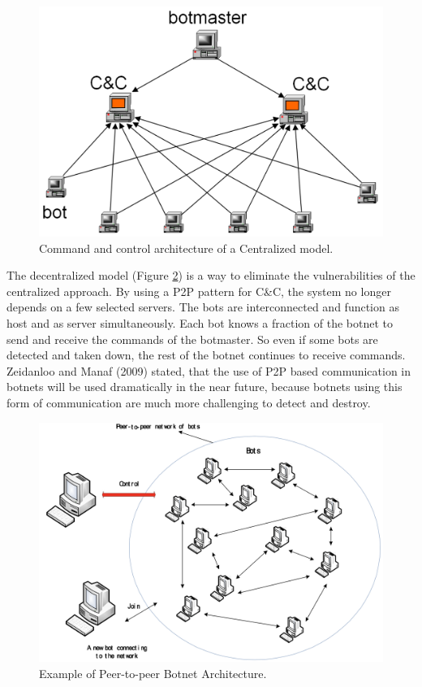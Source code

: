 \begin{figure}[ht]
\begin{center} \includegraphics[scale=0.3]{Talk11/CC-centralized} \end{center}
\caption{Command and control architecture of a Centralized model. \cite{Zeidanloo09}}
\label{fig:centralized}
\end{figure}

The decentralized model (Figure \ref{fig:decentralized}) is a way to eliminate the vulnerabilities of the centralized approach. By using a P2P pattern for C\&C, the system no longer depends on a few selected servers. The bots are interconnected and function as host and as server simultaneously. Each bot knows a fraction of the botnet to send and receive the commands of the botmaster. So even if some bots are detected and taken down, the rest of the botnet continues to receive commands. Zeidanloo and Manaf (2009) stated, that the use of P2P based communication in botnets will be used dramatically in the near future, because botnets using this form of communication are much more challenging to detect and destroy. \cite{Zeidanloo09}

\begin{figure}[ht]
\begin{center} \includegraphics[scale=0.3]{Talk11/CC-P2P} \end{center}
\caption{Example of Peer-to-peer Botnet Architecture. \cite{Zeidanloo09}}
\label{fig:decentralized}
\end{figure}

